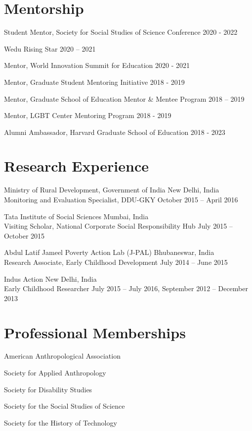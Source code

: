 \documentclass[11pt,letterpaper]{report}
\newcommand{\listitemspace}{0.25em}
\renewenvironment{itemize}{\begin{list}{}{\setlength{\leftmargin}{0em}\setlength{\parskip}{0em}\setlength{\itemsep}{\listitemspace}\setlength{\parsep}{\listitemspace}}}{\end{list}}
\begin{document}
    \section*{Mentorship}
    \begin{itemize}
        \item Student Mentor, Society for Social Studies of Science Conference 2020 - 2022
        \item Wedu Rising Star 2020 – 2021
        \item Mentor, World Innovation Summit for Education 2020 - 2021
        \item Mentor, Graduate Student Mentoring Initiative 2018 - 2019
        \item Mentor, Graduate School of Education Mentor \& Mentee Program 2018 – 2019
        \item Mentor, LGBT Center Mentoring Program 2018 - 2019
        \item Alumni Ambassador, Harvard Graduate School of Education 2018 - 2023
    \end{itemize}

    \section*{Research Experience}
    \begin{itemize}
        \item Ministry of Rural Development, Government of India New Delhi, India\\
        Monitoring and Evaluation Specialist, DDU-GKY October 2015 – April 2016
        \item Tata Institute of Social Sciences Mumbai, India\\
        Visiting Scholar, National Corporate Social Responsibility Hub July 2015 – October 2015
        \item Abdul Latif Jameel Poverty Action Lab (J-PAL) Bhubaneswar, India\\
        Research Associate, Early Childhood Development July 2014 – June 2015
        \item Indus Action New Delhi, India\\
        Early Childhood Researcher July 2015 – July 2016, September 2012 – December 2013
    \end{itemize}

    \section*{Professional Memberships}
    \begin{itemize}
        \item American Anthropological Association
        \item Society for Applied Anthropology
        \item Society for Disability Studies
        \item Society for the Social Studies of Science
        \item Society for the History of Technology
    \end{itemize}
\end{document}
